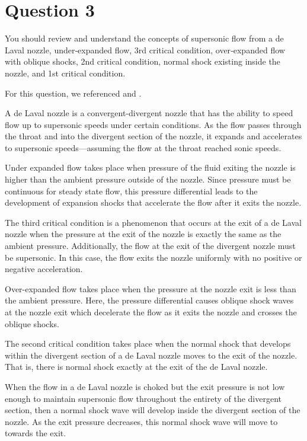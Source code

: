 \section{Question 3}
\begin{importantbox}
    You should review and understand the concepts of supersonic flow from a de Laval nozzle, under‐expanded flow, 3rd critical condition, over‐expanded flow with oblique shocks, 2nd critical condition, normal shock existing inside the nozzle, and 1st critical condition.
\end{importantbox}

For this question, we referenced \cite{Anderson_2016} and \cite{lecture12}.

A de Laval nozzle is a convergent-divergent nozzle that has the ability to speed flow up to supersonic speeds under certain conditions. As the flow passes through the throat and into the divergent section of the nozzle, it expands and accelerates to supersonic speeds—assuming the flow at the throat reached sonic speeds.

Under expanded flow takes place when pressure of the fluid exiting the nozzle is higher than the ambient pressure outside of the nozzle. Since pressure must be continuous for steady state flow, this pressure differential leads to the development of expansion shocks that accelerate the flow after it exits the nozzle.

The third critical condition is a phenomenon that occurs at the exit of a de Laval nozzle when the pressure at the exit of the nozzle is exactly the same as the ambient pressure. Additionally, the flow at the exit of the divergent nozzle must be supersonic. In this case, the flow exits the nozzle uniformly with no positive or negative acceleration.

Over-expanded flow takes place when the pressure at the nozzle exit is less than the ambient pressure. Here, the pressure differential causes oblique shock waves at the nozzle exit which decelerate the flow as it exits the nozzle and crosses the oblique shocks.

The second critical condition takes place when the normal shock that develops within the divergent section of a de Laval nozzle moves to the exit of the nozzle. That is, there is normal shock exactly at the exit of the de Laval nozzle.

When the flow in a de Laval nozzle is choked but the exit pressure is not low enough to maintain supersonic flow throughout the entirety of the divergent section, then a normal shock wave will develop inside the divergent section of the nozzle. As the exit pressure decreases, this normal shock wave will move to towards the exit.

